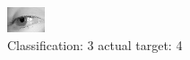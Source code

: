 \begin{figure}[h!]
\begin{center}
\includegraphics[width=0.60\columnwidth]{figures/ID2883_class_3_target_4.png}
\end{center}
\caption{ Classification: 3 actual target: 4}
\label{fig:ID2883_class_3_target_4}
\end{figure}
